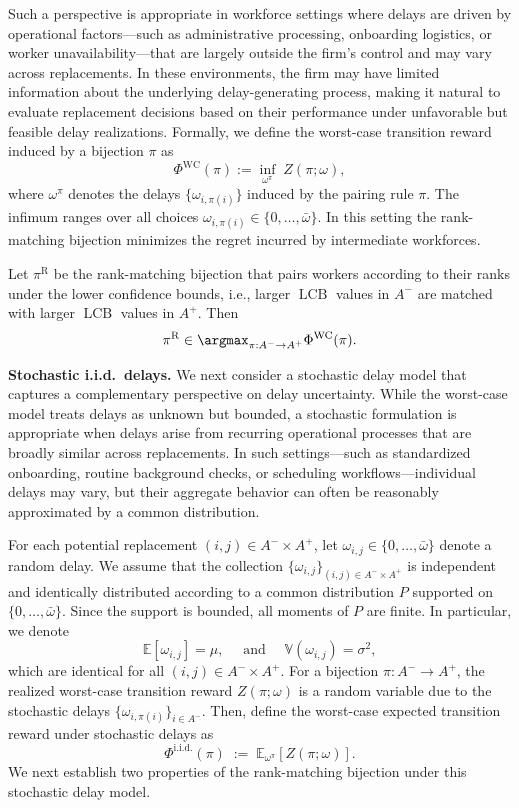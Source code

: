 \documentclass[opre,blindrev]{informs3}
\newcommand{\LCB}{\operatorname{LCB}}
\newcommand{\bbE}[2]{{{\mathbb{E}_{#1}\left[#2\right]}}}
\begin{document}
\begin{APPENDICES}
Such a perspective is appropriate in workforce settings where delays are driven by operational factors—such as administrative processing, onboarding logistics, or worker unavailability—that are largely outside the firm's control and may vary across replacements. In these environments, the firm may have limited information about the underlying delay-generating process, making it natural to evaluate replacement decisions based on their performance under unfavorable but feasible delay realizations. Formally, we define the worst-case transition reward induced by a bijection \(\pi\) as
\[\Phi^{\mathrm{WC}}(\pi):=\inf_{\omega^\pi}\;Z(\pi;\omega ),\]
where \(\omega^\pi\) denotes the delays \(\{\omega_{i,\pi(i)}\}\) induced by the pairing rule \(\pi\). The infimum ranges over all choices \(\omega_{i,\pi(i)} \in \{0,\dots,\bar{\omega}\}\). In this setting the rank-matching bijection minimizes the regret incurred by intermediate workforces.

\begin{proposition}
\label{lem:wc-rank-matching}
    Let \(\pi^{\mathrm{R}}\) be the rank-matching bijection that pairs workers according to their ranks under the lower confidence bounds, i.e., larger \(\LCB\) values in \(A^-\) are matched with larger \(\LCB\) values in \(A^+\). Then
    \[
    \pi^{\mathrm{R}} \in \argmax_{\pi : A^- \to A^+} \Phi^{\mathrm{WC}}(\pi).
    \]
\end{proposition}

{\bf Stochastic i.i.d.\ delays.}
We next consider a stochastic delay model that captures a complementary perspective on delay uncertainty. While the worst-case model treats delays as unknown but bounded, a stochastic formulation is appropriate when delays arise from recurring operational processes that are broadly similar across replacements. In such settings—such as standardized onboarding, routine background checks, or scheduling workflows—individual delays may vary, but their aggregate behavior can often be reasonably approximated by a common distribution.

For each potential replacement \((i,j)\in A^-\times A^+\), let \(\omega_{i,j}\in\{0,\dots,\bar{\omega}\}\) denote a random delay. We assume that the collection \(\{\omega_{i,j}\}_{(i,j)\in A^-\times A^+}\) is independent and identically distributed according to a common distribution \(P\) supported on \(\{0,\dots,\bar{\omega}\}\). Since the support is bounded, all moments of \(P\) are finite. In particular, we denote
\[\mathbb{E}[\omega_{i,j}] = \mu, \quad \text{ and } \quad \mathbb{V}(\omega_{i,j}) = \sigma^2, \]
which are identical for all \((i,j)\in A^{-}\times A^+\). For a bijection \(\pi:A^-\to A^+\), the realized worst-case transition reward \(Z(\pi;\omega )\) is a random variable due to the stochastic delays \(\{\omega_{i,\pi(i)}\}_{i\in A^-}\). Then, define the worst-case expected transition reward under stochastic delays as
\[ \Phi^{\mathrm{i.i.d.}}(\pi) \;:=\; \bbE{\omega^{\pi}}{Z(\pi;\omega)}.\]
We next establish two properties of the rank-matching bijection under this stochastic delay model.


\end{APPENDICES}
\end{document}

